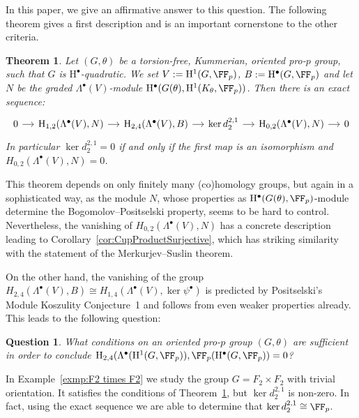 \documentclass{amsart}
\newtheorem{quest}[thm]{Question}
\newtheorem{mainthm}{Theorem}
\theoremstyle{definition}
\theoremstyle{remark}
\newcommand{\rmH}{\mathrm{H}}
\numberwithin{equation}{section}
\begin{document}
In this paper, we give an affirmative answer to this question. The following theorem gives a first description and is an important cornerstone to the other criteria.
\begin{mainthm}
\label{thm:TorSES}
    Let $(G,\theta)$ be a torsion-free, Kummerian, oriented pro-$p$ group, such that $G$ is $\rmH^\bullet$-quadratic. We set  $V:=\rmH^1(G,\FF_p)$, $B:=\rmH^\bullet(G,\FF_p)$ and let $N$ be the graded $\Lambda^\bullet(V)$-module $\rmH^\bullet(G(\theta),\rmH^1(K_\theta,\FF_p))$. Then there is an exact sequence:
    \begin{equation*}
        \begin{tikzcd}[column sep=small]
            0\arrow[r]&\rmH_{1,2}(\Lambda^\bullet(V),N)\arrow[r] &\rmH_{2,4}(\Lambda^\bullet(V),B)\arrow[r] &\ker d_2^{2,1}\arrow[r]&\rmH_{0,2}(\Lambda^\bullet(V),N)\arrow[r]&0
        \end{tikzcd}
    \end{equation*}
    In particular $\ker d_2^{2,1}=0$ if and only if the first map is an isomorphism and $H_{0,2}(\Lambda^\bullet(V),N)=0$.
\end{mainthm}
This theorem depends on only finitely many (co)homology groups, but again in a sophisticated way, as the module $N$, whose properties as $\rmH^\bullet(G(\theta),\FF_p)$-module determine the Bogomolov--Positselski property, seems to be hard to control. Nevertheless, the vanishing of $H_{0,2}(\Lambda^\bullet(V),N)$ has a concrete description leading to Corollary~\ref{cor:CupProductSurjective}, which has striking similarity with the statement of the Merkurjev--Suslin theorem. 

On the other hand, the vanishing of the group $H_{2,4}(\Lambda^\bullet(V),B)\cong H_{1,4}(\Lambda^\bullet(V),\ker \psi^\bullet)$ is predicted by Positselski's Module Koszulity Conjecture~1 and follows from even weaker properties already. This leads to the following question:
\begin{quest}
    \label{ques:IsTor24eq0}
    What conditions on an oriented pro-$p$ group $(G,\theta)$ are sufficient in order to conclude $\rmH_{2,4}(\Lambda^\bullet(\rmH^1(G,\FF_p)),\FF_p(\rmH^\bullet(G,\FF_p))=0$?
\end{quest}
In Example~\ref{exmp:F2 times F2} we study the group $G=F_2\times F_2$ with trivial orientation. It satisfies the conditions of Theorem~\ref{thm:TorSES}, but $\ker d^{2,1}_2$ is non-zero. In fact, using the exact sequence we are able to determine that $\ker d_2^{2,1}\cong \FF_p$. 
\end{document}
